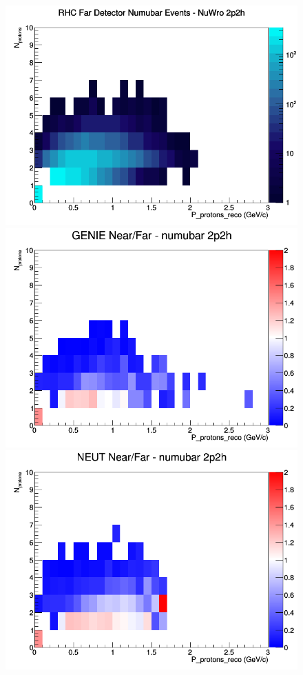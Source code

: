 \begin{figure}[h]
\endminipage
{}
\includegraphics[width=\linewidth]{eff_N_P/FGT/protons/2p2h_RHC_FD_numubar_N_P_NuWro.png}
\endminipage
\newline
{}
\includegraphics[width=\linewidth]{eff_N_P/FGT/protons/ratios/2p2h_GENIE_numubar_NF_N_P.png}
\endminipage
{}
\includegraphics[width=\linewidth]{eff_N_P/FGT/protons/ratios/2p2h_NEUT_numubar_NF_N_P.png}

\end{figure}
